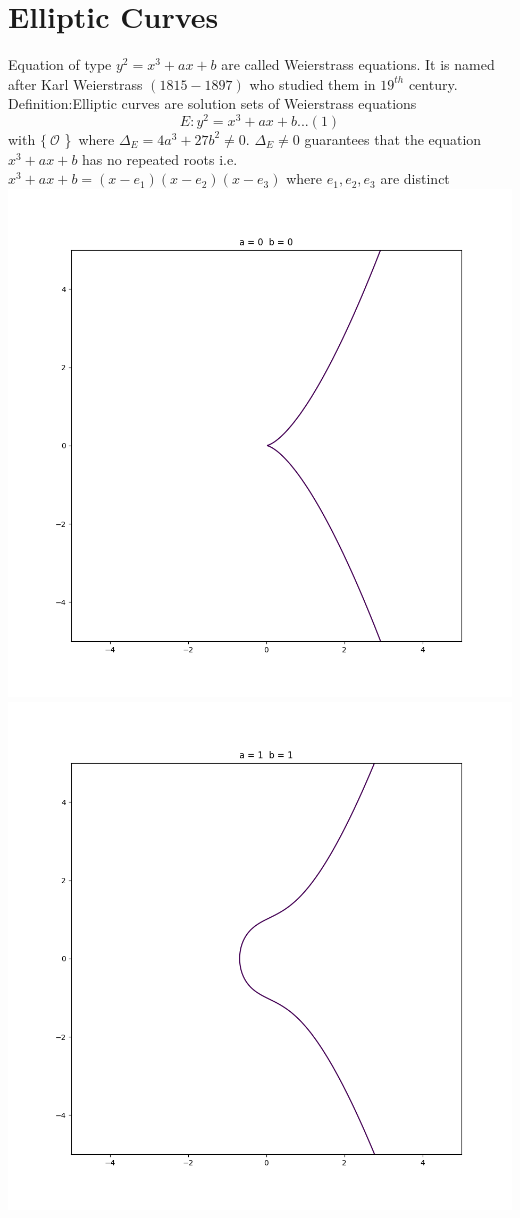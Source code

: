 \documentclass[12pt,a4paper]{report}
\begin{document}
\section{Elliptic Curves}
Equation of type $ y^2 = x^3+ax+b $ are called Weierstrass equations. It is named after Karl Weierstrass $(1815-1897)$ who studied them in $19^{th}$ century. \\
Definition:Elliptic curves are solution sets of Weierstrass equations
$$E:y^2 = x^3+ax+b ...(1)$$ with  $ \{\ \mathscr{O}  $ \}\ where $\Delta_E = 4a^3+27b^2\neq 0$. 
$\Delta_E \neq 0$ guarantees that the equation $x^3+ax+b$ has no repeated roots i.e. 
$ x^3+ax+b=(x-e_1)(x-e_2)(x-e_3)$ where $e_1,e_2,e_3$ are distinct\\
\includegraphics[scale=0.32]{Figure_1}
\includegraphics[scale=0.32]{Figure_2}\\
\end{document}
